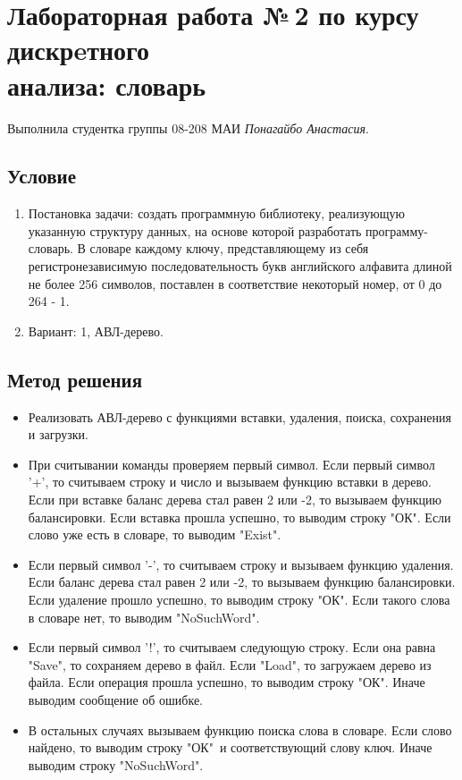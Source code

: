 \documentclass[12pt]{article}
\begin{document}
	
	\section*{Лабораторная работа №\,2 по курсу дискрeтного \\ анализа: словарь}
	
	\noindent Выполнила студентка группы 08-208 МАИ \textit{Понагайбо Анастасия}.
	
	\subsection*{Условие}
	
	\begin{enumerate}
		\item Постановка задачи: создать программную библиотеку, реализующую указанную структуру данных, на основе которой разработать программу-словарь. В словаре каждому ключу, представляющему из себя регистронезависимую последовательность букв английского алфавита длиной не более 256 символов, поставлен в соответствие некоторый номер, от 0 до 264 - 1.
		\item Вариант: 1, АВЛ-дерево.
	\end{enumerate}
	
	\subsection*{Метод решения}
    \begin{itemize}
		\item Реализовать АВЛ-дерево с функциями вставки, удаления, поиска, сохранения и загрузки.
		\item При считывании команды проверяем первый символ. Если первый символ '+', то считываем строку и число и вызываем функцию вставки в дерево. Если при вставке баланс дерева стал равен 2 или -2, то вызываем функцию балансировки. Если вставка прошла успешно, то выводим строку "ОК". Если слово уже есть в словаре, то выводим "Exist".
		\item Если первый символ '-', то считываем строку и вызываем функцию удаления. Если баланс дерева стал равен 2 или -2, то вызываем функцию балансировки. Если удаление прошло успешно, то выводим строку "ОК". Если такого слова в словаре нет, то выводим "NoSuchWord".
		\item Если первый символ '!', то считываем следующую строку. Если она равна "Save"{}, то сохраняем дерево в файл. Если "Load"{}, то загружаем дерево из файла. Если операция прошла успешно, то выводим строку "ОК". Иначе выводим сообщение об ошибке.
		\item В остальных случаях вызываем функцию поиска слова в словаре. Если слово найдено, то выводим строку "ОК"\ и соответствующий слову ключ. Иначе выводим строку "NoSuchWord".
	\end{itemize}
\end{document}
